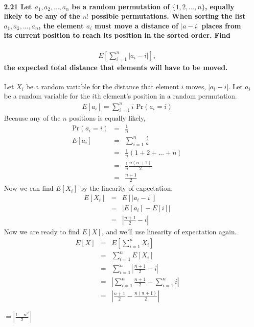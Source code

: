 \documentclass{article}
\begin{document}
\paragraph{2.21 Let $a_1, a_2, ..., a_n$ be a random permutation of 
$\{1, 2, ..., n\}$, equally likely to be any of the $n!$ possible permutations. 
When sorting the list $a_1, a_2, ..., a_n$, the element $a_i$ must move a 
distance of $|a-i|$ places from its current position to reach its 
position in the sorted order. Find}
\begin{eqnarray*}
E\left[\sum_{i=1}^n |a_i-i|\right],
\end{eqnarray*}
\textbf{the expected total distance that elements will have to be moved.\\\\}
Let $X_i$ be a random variable for the distance that element $i$ moves, 
$|a_i-i|$. Let $a_i$ be a random variable for the $i$th element's 
position in a random permutation.
\begin{eqnarray*}
E[a_i] = \sum_{i=1}^n i\mbox{ Pr}(a_i=i)
\end{eqnarray*}
Because any of the $n$ positions is equally likely,
\begin{eqnarray*}
\mbox{Pr}(a_i=i) & = & \frac{1}{n}\\
E[a_i] & = & \sum_{i=1}^n \frac{i}{n}\\
	& = & \frac{1}{n}(1+2+...+n)\\
	& = & \frac{1}{n}\frac{n(n+1)}{2}\\
	& = & \frac{n+1}{2}
\end{eqnarray*}
Now we can find $E[X_i]$ by the linearity of expectation.
\begin{eqnarray*}
E[X_i] & = & E[|a_i-i|]\\
	& = & |E[a_i]-E[i]|\\
	& = & \left|\frac{n+1}{2}-i\right|
\end{eqnarray*}
Now we are ready to find $E[X]$, and we'll use linearity of expectation again.
\begin{eqnarray*}
E[X] & = & E\left[\sum_{i=1}^n X_i\right]\\
	& = & \sum_{i=1}^n E[X_i]\\
	& = & \sum_{i=1}^n \left|\frac{n+1}{2}-i\right|\\
	& = & \left|\sum_{i=1}^n \frac{n+1}{2}-\sum_{i=1}^n i\right|\\
	& = & \left|\frac{n+1}{2}-\frac{n(n+1)}{2}\right|
\end{eqnarray*}
\begin{center}
$\boxed{=\left|\frac{1-n^2}{2}\right|}$
\end{center}
\end{document}
